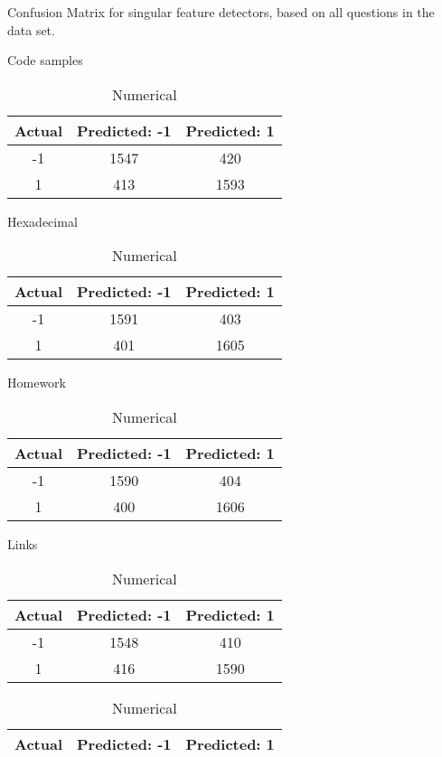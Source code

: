 \begin{table}[!htb]
	\caption{Confusion Matrix for singular feature detectors, based on all questions in the data set.}
	\begin{minipage}{.5\linewidth}
		\caption{Code samples}
		\centering
		\begin{tabular}{| c | c | c |}
			\hline
			Actual 		& Predicted: -1	& Predicted: 1	\\ \hline
			-1			& 1547			& 420			\\ \hline
			1			& 413			& 1593			\\ \hline
		\end{tabular}
	\end{minipage}%
	\begin{minipage}{.5\linewidth}
		\centering
		\caption{Hexadecimal}
		\begin{tabular}{| c | c | c |}
			\hline
			Actual 		& Predicted: -1	& Predicted: 1	\\ \hline
			-1			& 1591			& 403			\\ \hline
			1			& 401			& 1605			\\ \hline
		\end{tabular}
	\end{minipage} 
	\begin{minipage}{.5\linewidth}
		\caption{Homework}
		\centering
		\begin{tabular}{| c | c | c |}
			\hline
			Actual 		& Predicted: -1	& Predicted: 1	\\ \hline
			-1			& 1590			& 404			\\ \hline
			1			& 400			& 1606			\\ \hline
		\end{tabular}
	\end{minipage}%
	\begin{minipage}{.5\linewidth}
		\centering
		\caption{Links}
		\begin{tabular}{| c | c | c |}
			\hline
			Actual 		& Predicted: -1	& Predicted: 1	\\ \hline
			-1			& 1548			& 410			\\ \hline
			1			& 416			& 1590			\\ \hline
		\end{tabular}
	\end{minipage} 	
	\begin{minipage}{.5\linewidth}
		\centering
		\caption{Numerical}
		\begin{tabular}{| c | c | c |}
			\hline
			Actual 		& Predicted: -1	& Predicted: 1	\\ \hline

\end{tabular}
\end{minipage}
\end{table}
